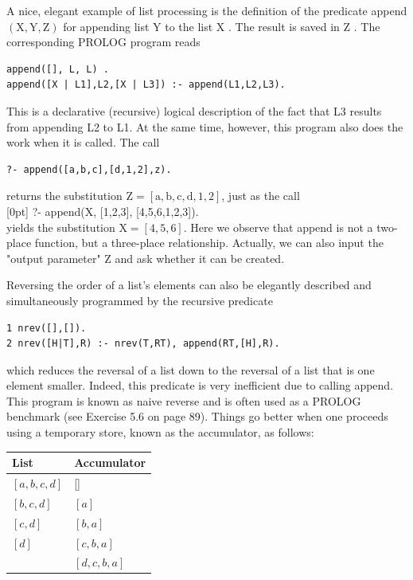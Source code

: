 \documentclass[10pt]{book}
\begin{document}
A nice, elegant example of list processing is the definition of the predicate append $(\mathrm{X}, \mathrm{Y}, \mathrm{Z})$ for appending list Y to the list X . The result is saved in Z . The corresponding PROLOG program reads

\begin{verbatim}
append([], L, L) .
append([X | L1],L2,[X | L3]) :- append(L1,L2,L3).
\end{verbatim}

This is a declarative (recursive) logical description of the fact that L3 results from appending L2 to L1. At the same time, however, this program also does the work when it is called. The call

\begin{verbatim}
?- append([a,b,c],[d,1,2],z).
\end{verbatim}

returns the substitution $\mathrm{Z}=[\mathrm{a}, \mathrm{b}, \mathrm{c}, \mathrm{d}, 1,2]$, just as the call\\
[0pt]
?- append(X, [1,2,3], [4,5,6,1,2,3]).\\
yields the substitution $\mathrm{X}=[4,5,6]$. Here we observe that append is not a two-place function, but a three-place relationship. Actually, we can also input the "output parameter" Z and ask whether it can be created.

Reversing the order of a list's elements can also be elegantly described and simultaneously programmed by the recursive predicate

\begin{verbatim}
1 nrev([],[]).
2 nrev([H|T],R) :- nrev(T,RT), append(RT,[H],R).
\end{verbatim}

which reduces the reversal of a list down to the reversal of a list that is one element smaller. Indeed, this predicate is very inefficient due to calling append. This program is known as naive reverse and is often used as a PROLOG benchmark (see Exercise 5.6 on page 89). Things go better when one proceeds using a temporary store, known as the accumulator, as follows:

\begin{center}
\begin{tabular}{ll}
\hline
List & Accumulator \\
\hline
$[a, b, c, d]$ & [] \\
\hline
$[b, c, d]$ & $[a]$ \\
\hline
$[c, d]$ & $[b, a]$ \\
\hline
$[d]$ & $[c, b, a]$ \\
\hline
[] & $[d, c, b, a]$ \\
\hline
\end{tabular}
\end{center}
\end{document}
